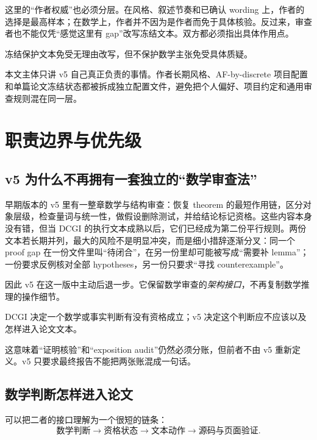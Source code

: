 \documentclass[UTF8,fontset=none,12pt,openany]{ctexbook}
\begin{document}
这里的“作者权威”也必须分层。在风格、叙述节奏和已确认 wording 上，作者的选择是最高样本；在数学上，作者并不因为是作者而免于具体核验。反过来，审查者也不能仅凭“感觉这里有 gap”改写冻结文本。双方都必须指出具体作用点。

\begin{principle}[冻结文本的边界]
冻结保护文本免受无理由改写，但不保护数学主张免受具体质疑。
\end{principle}

本文主体只讲 v5 自己真正负责的事情。作者长期风格、AF-by-discrete 项目配置和单篇论文冻结状态都被拆成独立配置文件，避免把个人偏好、项目约定和通用审查规则混在同一层。

\tableofcontents

\mainmatter
\chapter{职责边界与优先级}

\section{v5 为什么不再拥有一套独立的“数学审查法”}

早期版本的 v5 里有一整章数学与结构审查：恢复 theorem 的最短作用链，区分对象层级，检查量词与统一性，做假设删除测试，并给结论标记资格。这些内容本身没有错，但当 DCGI 的执行文本成熟以后，它们已经成为第二份平行规则。两份文本若长期并列，最大的风险不是明显冲突，而是细小措辞逐渐分叉：同一个 proof gap 在一份文件里叫“待闭合”，在另一份里却可能被写成“需要补 lemma”；一份要求反例核对全部 hypotheses，另一份只要求“寻找 counterexample”。

因此 v5 在这一版中主动后退一步。它保留数学审查的\emph{架构接口}，不再复制数学推理的操作细节。

\begin{principle}[分工]
DCGI 决定一个数学或事实判断有没有资格成立；v5 决定这个判断应不应该以及怎样进入论文文本。
\end{principle}

这意味着“证明核验”和“exposition audit”仍然必须分账，但前者不由 v5 重新定义。v5 只要求最终报告不能把两张账混成一句话。

\section{数学判断怎样进入论文}

可以把二者的接口理解为一个很短的链条：
\[
\text{数学判断}\longrightarrow\text{资格状态}\longrightarrow\text{文本动作}\longrightarrow\text{源码与页面验证}.
\]
\end{document}
